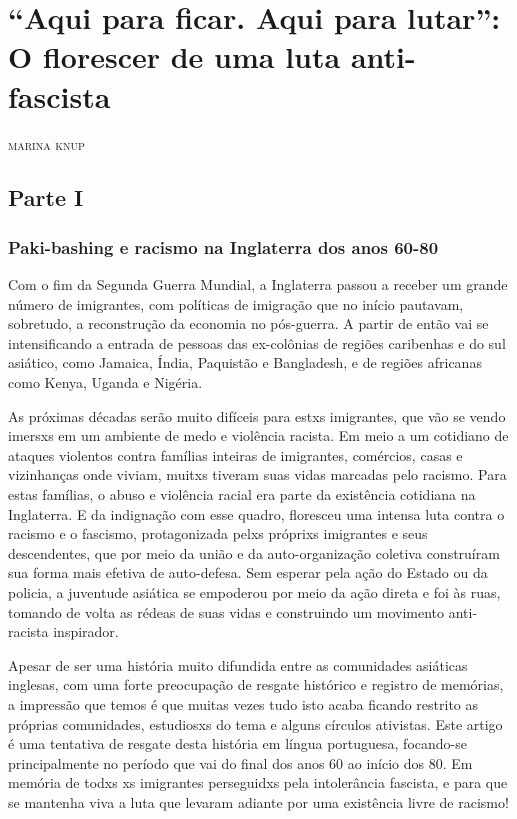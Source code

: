 \chapter{``Aqui para ficar. Aqui para lutar'': O florescer de uma luta anti-fascista}

\hfill{}\textsc{marina knup}

\bigskip

\section{Parte I}

\subsection{Paki-bashing e racismo na Inglaterra dos anos 60-80}

Com o fim da Segunda Guerra Mundial, a Inglaterra passou a receber um grande número de imigrantes, com políticas de imigração que no início pautavam, sobretudo, a reconstrução da economia no pós-guerra. A partir de então vai se intensificando a entrada de pessoas das ex-colônias de regiões caribenhas e do sul asiático, como Jamaica, Índia, Paquistão e Bangladesh, e de regiões africanas como Kenya, Uganda e Nigéria.

As próximas décadas serão muito difíceis para estxs imigrantes, que vão se vendo imersxs em um ambiente de medo e violência racista. Em meio a um cotidiano de ataques violentos contra famílias inteiras de imigrantes, comércios, casas e vizinhanças onde viviam, muitxs tiveram suas vidas marcadas pelo racismo. Para estas famílias, o abuso e violência racial era parte da existência cotidiana na Inglaterra. E da indignação com esse quadro, floresceu uma intensa luta contra o racismo e o fascismo, protagonizada pelxs próprixs imigrantes e seus descendentes, que por meio da união e da auto-organização coletiva construíram sua forma mais efetiva de auto-defesa. Sem esperar pela ação do Estado ou da policia, a juventude asiática se empoderou por meio da ação direta e foi às ruas, tomando de volta as rédeas de suas vidas e construindo um movimento anti-racista inspirador.

Apesar de ser uma história muito difundida entre as comunidades asiáticas inglesas, com uma forte preocupação de resgate histórico e registro de memórias, a impressão que temos é que muitas vezes tudo isto acaba ficando restrito as próprias comunidades, estudiosxs do tema e alguns círculos ativistas. Este artigo é uma tentativa de resgate desta história em língua portuguesa, focando-se principalmente no período que vai do final dos anos 60 ao início dos 80. Em memória de todxs xs imigrantes perseguidxs pela intolerância fascista, e para que se mantenha viva a luta que levaram adiante por uma existência livre de racismo!

